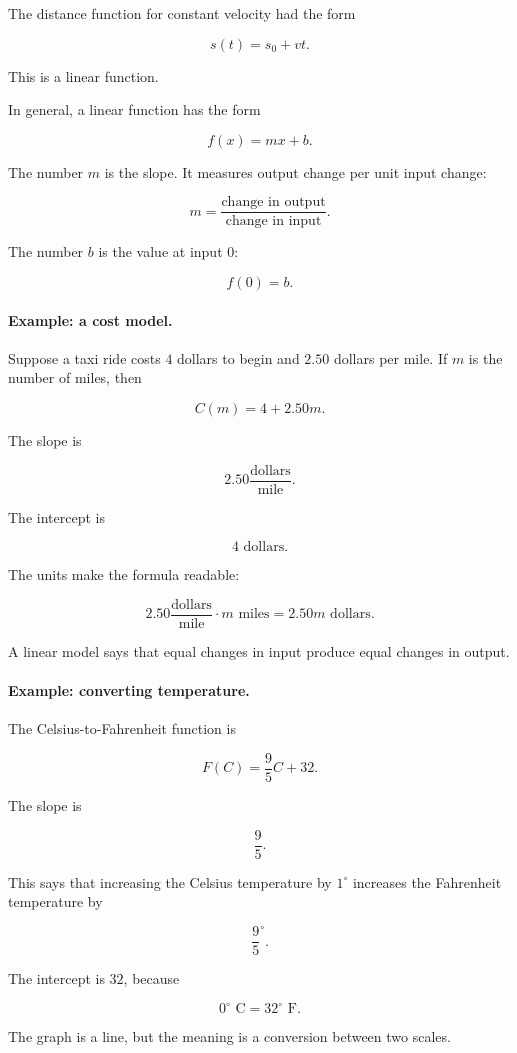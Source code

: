 The distance function for constant velocity had the form

\[
s(t)=s_0+vt.
\]

This is a linear function.

In general, a linear function has the form

\[
f(x)=mx+b.
\]

The number \(m\) is the slope. It measures output change per unit input change:

\[
m=\frac{\text{change in output}}{\text{change in input}}.
\]

The number \(b\) is the value at input \(0\):

\[
f(0)=b.
\]

\paragraph{Example: a cost model.}
Suppose a taxi ride costs \(4\) dollars to begin and \(2.50\) dollars per mile. If \(m\) is the number of miles, then

\[
C(m)=4+2.50m.
\]

The slope is

\[
2.50\frac{\text{dollars}}{\text{mile}}.
\]

The intercept is

\[
4\text{ dollars}.
\]

The units make the formula readable:

\[
2.50\frac{\text{dollars}}{\text{mile}}\cdot m\text{ miles}
=
2.50m\text{ dollars}.
\]

A linear model says that equal changes in input produce equal changes in output.

\paragraph{Example: converting temperature.}
The Celsius-to-Fahrenheit function is

\[
F(C)=\frac95 C+32.
\]

The slope is

\[
\frac95.
\]

This says that increasing the Celsius temperature by \(1^\circ\) increases the Fahrenheit temperature by

\[
\frac95^\circ.
\]

The intercept is \(32\), because

\[
0^\circ\text{ C}=32^\circ\text{ F}.
\]

The graph is a line, but the meaning is a conversion between two scales.

